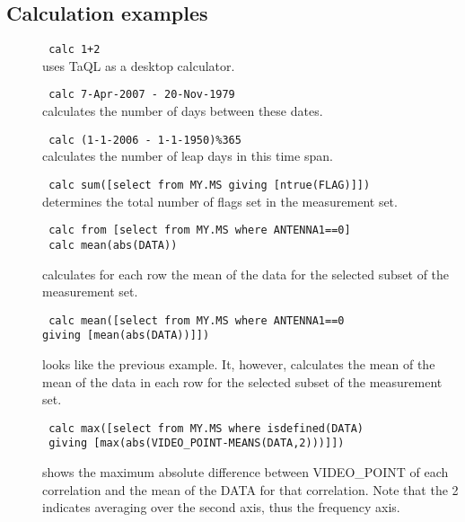 \subsection{\label{TAQL:CALCEXAMPLES}Calculation examples}
\begin{description}
  \item[] \texttt{ calc 1+2 }
      \\uses TaQL as a desktop calculator.

  \item[] \texttt{ calc 7-Apr-2007 - 20-Nov-1979 }
      \\calculates the number of days between these dates.

  \item[] \texttt{ calc (1-1-2006 - 1-1-1950)\%365 }
      \\calculates the number of leap days in this time span.

  \item[] \texttt{ calc sum([select from MY.MS giving [ntrue(FLAG)]]) }
      \\determines the total number of flags set in the measurement set.

  \item[] \texttt{ calc from [select from MY.MS where ANTENNA1==0] }
          \\\texttt{ calc mean(abs(DATA)) }

        calculates for each row the mean of the data for the selected
        subset of the measurement set.

  \item[] \texttt{ calc mean([select from MY.MS where ANTENNA1==0 }
          \\\texttt{giving [mean(abs(DATA))]]) }

        looks like the previous example. It, however, calculates the
        mean of the mean of the data in each row for the selected
        subset of the measurement set.

  \item[] \texttt{ calc max([select from MY.MS where isdefined(DATA) }
          \\\texttt{ giving [max(abs(VIDEO\_POINT-MEANS(DATA,2)))]]) }

        shows the maximum absolute difference between VIDEO\_POINT of
        each correlation and the mean of the DATA for that correlation.
        Note that the 2 indicates averaging over the second axis,
        thus the frequency axis.

\end{description}


